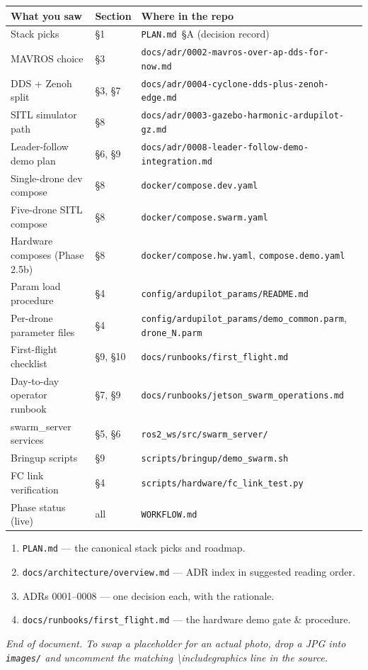 \documentclass[11pt,a4paper]{article}
\begin{document}
\small
\begin{tabularx}{\textwidth}{@{}llX@{}}
\toprule
\textbf{What you saw} & \textbf{Section} & \textbf{Where in the repo} \\
\midrule
Stack picks & §1 & \texttt{PLAN.md}~\S A (decision record) \\
MAVROS choice & §3 & \texttt{docs/adr/0002-mavros-over-ap-dds-for-now.md} \\
DDS + Zenoh split & §3, §7 & \texttt{docs/adr/0004-cyclone-dds-plus-zenoh-edge.md} \\
SITL simulator path & §8 & \texttt{docs/adr/0003-gazebo-harmonic-ardupilot-gz.md} \\
Leader-follow demo plan & §6, §9 & \texttt{docs/adr/0008-leader-follow-demo-integration.md} \\
Single-drone dev compose & §8 & \texttt{docker/compose.dev.yaml} \\
Five-drone SITL compose & §8 & \texttt{docker/compose.swarm.yaml} \\
Hardware composes (Phase 2.5b) & §8 & \texttt{docker/compose.hw.yaml}, \texttt{compose.demo.yaml} \\
Param load procedure & §4 & \texttt{config/ardupilot\_params/README.md} \\
Per-drone parameter files & §4 & \texttt{config/ardupilot\_params/demo\_common.parm}, \texttt{drone\_N.parm} \\
First-flight checklist & §9, §10 & \texttt{docs/runbooks/first\_flight.md} \\
Day-to-day operator runbook & §7, §9 & \texttt{docs/runbooks/jetson\_swarm\_operations.md} \\
swarm\_server services & §5, §6 & \texttt{ros2\_ws/src/swarm\_server/} \\
Bringup scripts & §9 & \texttt{scripts/bringup/demo\_swarm.sh} \\
FC link verification & §4 & \texttt{scripts/hardware/fc\_link\_test.py} \\
Phase status (live) & all & \texttt{WORKFLOW.md} \\
\bottomrule
\end{tabularx}

\vspace{1em}

\begin{tcolorbox}[colback=lightaccent, colframe=fcblue, arc=2pt, boxrule=0.4pt,
                  title={\small\bfseries Reading order if you want to dig deeper},
                  fonttitle=\color{fcblue}]
\begin{enumerate}[leftmargin=*, itemsep=0.2em]
  \item \texttt{PLAN.md} --- the canonical stack picks and roadmap.
  \item \texttt{docs/architecture/overview.md} --- ADR index in suggested reading order.
  \item ADRs 0001--0008 --- one decision each, with the rationale.
  \item \texttt{docs/runbooks/first\_flight.md} --- the hardware demo gate \& procedure.
\end{enumerate}
\end{tcolorbox}

\vfill

\begin{center}
\small\itshape
End of document. To swap a placeholder for an actual photo, drop a JPG into
\texttt{images/} and uncomment the matching \textbackslash{}includegraphics line
in the source.
\end{center}
\end{document}
